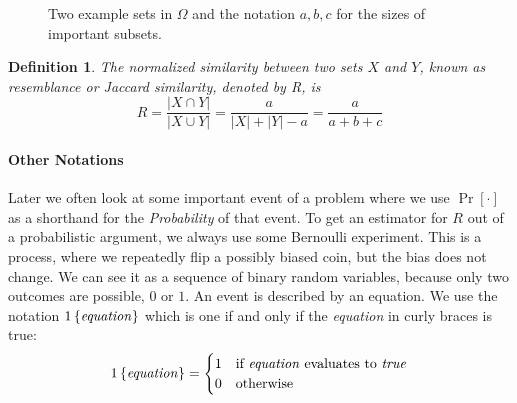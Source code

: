 \documentclass[a4paper]{article}
\newtheorem{mydef}{Definition}
\begin{document}
\begin{figure}[H]
\centering
{}
\caption{Two example sets in $\Omega$ and the notation $a,b,c$ for the sizes of important subsets.}
\label{fig:sets}
\end{figure}

\begin{framed}
\begin{mydef}\label{def:jaccard}
The normalized similarity between two sets $X$ and $Y$, known as \emph{resemblance} or \emph{Jaccard similarity}, denoted by R, is
\begin{equation}
R=\frac{\left| X \cap Y \right|}{\left| X \cup Y \right|} = \frac{a}{\left| X \right| + \left| Y \right| -a}=\frac{a}{a+b+c}
\end{equation}
\end{mydef}
\end{framed}

\paragraph{Other Notations}
 
Later we often look at some important event of a problem where we use $\Pr[\cdot]$ as a shorthand for the \emph{Probability} of that event. To get an estimator for $R$ out of a probabilistic argument, we always use some Bernoulli experiment. This is a process, where we repeatedly flip a possibly biased coin, but the bias does not change. We can see it as a sequence of binary random variables, because only two outcomes are possible, $0$ or $1$. An event is described by an equation. We use the notation $1\left\lbrace \text{\textit{equation}} \right\rbrace$ which is one if and only if the \textit{equation} in curly braces is true:
\begin{equation*}
1\left\lbrace \text{\textit{equation}} \right\rbrace =\begin{cases}
    1 & \text{if \textit{equation} evaluates to \textit{true}} \\
    0 & \text{otherwise}
\end{cases}
\end{equation*}
\end{document}
